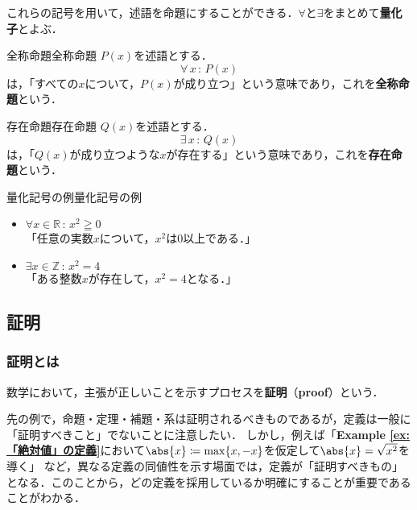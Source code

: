 \documentclass[a4paper,11pt]{ltjsarticle}
\renewcommand{\emph}[1]{\textbf{#1}}
\newcommand{\exref}[1]{{\bfseries\sffamily Example \ref{ex:#1}}}
\renewcommand{\geq}{\geqq}
\begin{document}
これらの記号を用いて，述語を命題にすることができる．$\forall$と$\exists$をまとめて\emph{量化子}とよぶ．

\begin{definition}{全称命題}{全称命題}
  $P(x)$を述語とする．
  \[
    \forall\, x \, : \, P(x)
  \]
  は，「すべての$x$について，$P(x)$が成り立つ」という意味であり，これを\emph{全称命題}という．
\end{definition}

\begin{definition}{存在命題}{存在命題}
  $Q(x)$を述語とする．
  \[
    \exists \,  x\, : \, Q(x)
  \]
  は，「$Q(x)$が成り立つような$x$が存在する」という意味であり，これを\emph{存在命題}という．
\end{definition}

\begin{example}{量化記号の例}{量化記号の例}
  \begin{itemize}
    \item $\forall x \in \mathbb{R}\, : \, x^2 \geq 0$\\
          「任意の実数$x$について，$x^2$は$0$以上である．」
    \item $\exists x \in \mathbb{Z} \, : \, x^2 = 4$\\
          「ある整数$x$が存在して，$x^2 = 4$となる．」
  \end{itemize}
\end{example}

\subsection{証明}

\subsubsection{証明とは}
数学において，主張が正しいことを示すプロセスを\emph{証明}（\emph{proof}）という．

先の例で，命題・定理・補題・系は証明されるべきものであるが，定義は一般に「証明すべきこと」でないことに注意したい．
しかし，例えば「\exref{「絶対値」の定義}において$\abs{x} \coloneqq \max \{ x, -x \}$を仮定して$\abs{x} = \sqrt{x^2}$を導く」
など，異なる定義の同値性を示す場面では，定義が「証明すべきもの」となる．このことから，どの定義を採用しているか明確にすることが重要であることがわかる．
\end{document}
